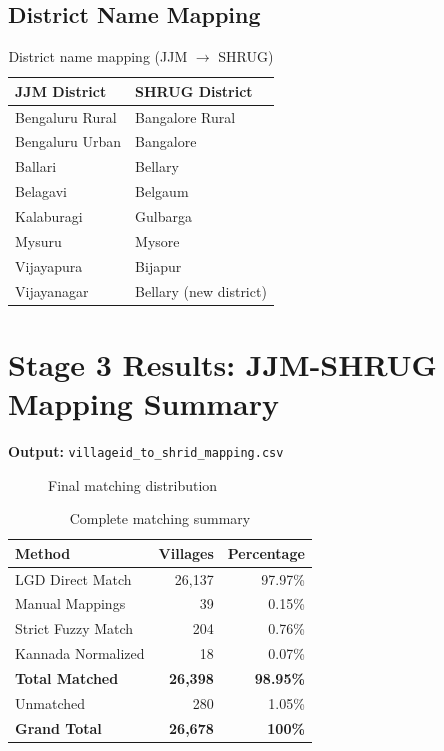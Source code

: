\documentclass[11pt,a4paper]{article}
\begin{document}
\subsection{District Name Mapping}

\begin{table}[h]
\centering
\begin{tabular}{ll}
\toprule
\textbf{JJM District} & \textbf{SHRUG District} \\
\midrule
Bengaluru Rural & Bangalore Rural \\
Bengaluru Urban & Bangalore \\
Ballari & Bellary \\
Belagavi & Belgaum \\
Kalaburagi & Gulbarga \\
Mysuru & Mysore \\
Vijayapura & Bijapur \\
Vijayanagar & Bellary (new district) \\
\bottomrule
\end{tabular}
\caption{District name mapping (JJM $\rightarrow$ SHRUG)}
\end{table}

\section{Stage 3 Results: JJM-SHRUG Mapping Summary}

\textbf{Output:} \texttt{villageid\_to\_shrid\_mapping.csv}

\begin{figure}[h]
\centering
{}
\caption{Final matching distribution}
\end{figure}

\begin{table}[h]
\centering
\begin{tabular}{lrr}
\toprule
\textbf{Method} & \textbf{Villages} & \textbf{Percentage} \\
\midrule
LGD Direct Match & 26,137 & 97.97\% \\
Manual Mappings & 39 & 0.15\% \\
Strict Fuzzy Match & 204 & 0.76\% \\
Kannada Normalized & 18 & 0.07\% \\
\midrule
\textbf{Total Matched} & \textbf{26,398} & \textbf{98.95\%} \\
Unmatched & 280 & 1.05\% \\
\midrule
\textbf{Grand Total} & \textbf{26,678} & \textbf{100\%} \\
\bottomrule
\end{tabular}
\caption{Complete matching summary}
\end{table}
\end{document}
